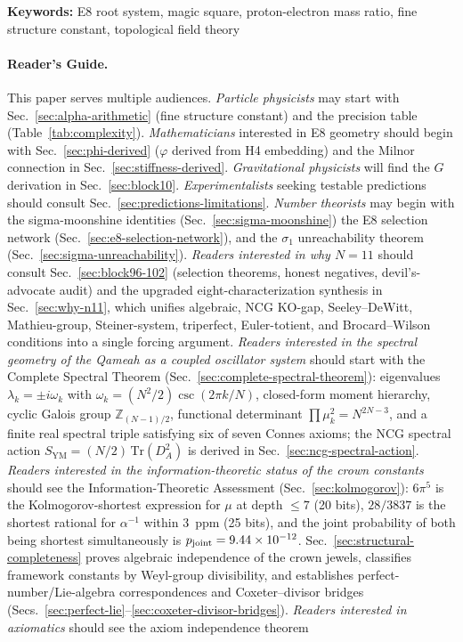 \documentclass[aps,prd,twocolumn,superscriptaddress,floatfix,nofootinbib]{revtex4-2}
\theoremstyle{definition}
\theoremstyle{remark}
\begin{document}
\noindent\textbf{Keywords:} E8 root system, magic square, proton-electron mass ratio, fine structure constant, topological field theory

\maketitle

\tableofcontents

\paragraph*{Reader's Guide.}
This paper serves multiple audiences. \textit{Particle physicists} may start with Sec.~\ref{sec:alpha-arithmetic} (fine structure constant) and the precision table (Table~\ref{tab:complexity}). \textit{Mathematicians} interested in E8 geometry should begin with Sec.~\ref{sec:phi-derived} ($\varphi$ derived from H4 embedding) and the Milnor connection in Sec.~\ref{sec:stiffness-derived}. \textit{Gravitational physicists} will find the $G$ derivation in Sec.~\ref{sec:block10}. \textit{Experimentalists} seeking testable predictions should consult Sec.~\ref{sec:predictions-limitations}. \textit{Number theorists} may begin with the sigma-moonshine identities (Sec.~\ref{sec:sigma-moonshine}) the E8 selection network (Sec.~\ref{sec:e8-selection-network}), and the $\sigma_1$ unreachability theorem (Sec.~\ref{sec:sigma-unreachability}). \textit{Readers interested in why $N{=}11$} should consult Sec.~\ref{sec:block96-102} (selection theorems, honest negatives, devil's-advocate audit) and the upgraded eight-characterization synthesis in Sec.~\ref{sec:why-n11}, which unifies algebraic, NCG KO-gap, Seeley--DeWitt, Mathieu-group, Steiner-system, triperfect, Euler-totient, and Brocard--Wilson conditions into a single forcing argument. \textit{Readers interested in the spectral geometry of the Qameah as a coupled oscillator system} should start with the Complete Spectral Theorem (Sec.~\ref{sec:complete-spectral-theorem}): eigenvalues $\lambda_k = \pm i\omega_k$ with $\omega_k = (N^2/2)\csc(2\pi k/N)$, closed-form moment hierarchy, cyclic Galois group $\mathbb{Z}_{(N-1)/2}$, functional determinant $\prod\mu_k^2 = N^{2N-3}$, and a finite real spectral triple satisfying six of seven Connes axioms; the NCG spectral action $S_{\mathrm{YM}} = (N/2)\,\mathrm{Tr}(D_A^2)$ is derived in Sec.~\ref{sec:ncg-spectral-action}. \textit{Readers interested in the information-theoretic status of the crown constants} should see the Information-Theoretic Assessment (Sec.~\ref{sec:kolmogorov}): $6\pi^5$ is the Kolmogorov-shortest expression for $\mu$ at depth $\le 7$ (20 bits), $28/3837$ is the shortest rational for $\alpha^{-1}$ within 3~ppm (25 bits), and the joint probability of both being shortest simultaneously is $p_{\rm joint} = 9.44\times10^{-12}$. Sec.~\ref{sec:structural-completeness} proves algebraic independence of the crown jewels, classifies framework constants by Weyl-group divisibility, and establishes perfect-number/Lie-algebra correspondences and Coxeter--divisor bridges (Secs.~\ref{sec:perfect-lie}--\ref{sec:coxeter-divisor-bridges}). \textit{Readers interested in axiomatics} should see the axiom independence theorem 
\end{document}
